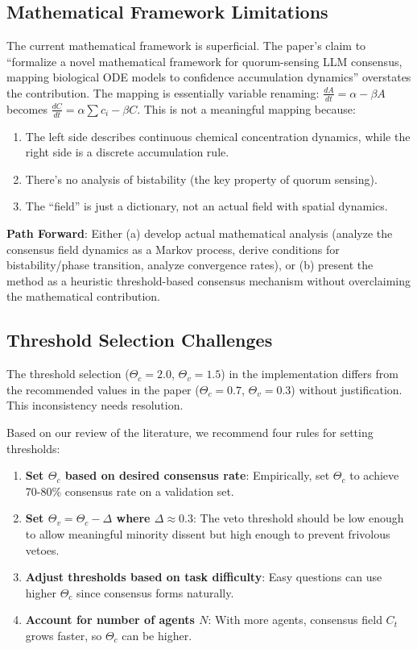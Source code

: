 \documentclass[11pt,letterpaper]{article}
\begin{document}
\subsection{Mathematical Framework Limitations}

The current mathematical framework is superficial. The paper's claim to ``formalize a novel mathematical framework for quorum-sensing LLM consensus, mapping biological ODE models to confidence accumulation dynamics'' overstates the contribution. The mapping is essentially variable renaming: $\frac{dA}{dt} = \alpha - \beta A$ becomes $\frac{dC}{dt} = \alpha \sum c_i - \beta C$. This is not a meaningful mapping because:

\begin{enumerate}
\item The left side describes continuous chemical concentration dynamics, while the right side is a discrete accumulation rule.
\item There's no analysis of bistability (the key property of quorum sensing).
\item The ``field'' is just a dictionary, not an actual field with spatial dynamics.
\end{enumerate}

\textbf{Path Forward}: Either (a) develop actual mathematical analysis (analyze the consensus field dynamics as a Markov process, derive conditions for bistability/phase transition, analyze convergence rates), or (b) present the method as a heuristic threshold-based consensus mechanism without overclaiming the mathematical contribution.

\subsection{Threshold Selection Challenges}

The threshold selection ($\Theta_c=2.0$, $\Theta_v=1.5$) in the implementation differs from the recommended values in the paper ($\Theta_c=0.7$, $\Theta_v=0.3$) without justification. This inconsistency needs resolution.

Based on our review of the literature, we recommend four rules for setting thresholds:

\begin{enumerate}
\item \textbf{Set $\Theta_c$ based on desired consensus rate}: Empirically, set $\Theta_c$ to achieve 70-80\% consensus rate on a validation set.
\item \textbf{Set $\Theta_v = \Theta_c - \Delta$ where $\Delta \approx 0.3$}: The veto threshold should be low enough to allow meaningful minority dissent but high enough to prevent frivolous vetoes.
\item \textbf{Adjust thresholds based on task difficulty}: Easy questions can use higher $\Theta_c$ since consensus forms naturally.
\item \textbf{Account for number of agents $N$}: With more agents, consensus field $C_t$ grows faster, so $\Theta_c$ can be higher.
\end{enumerate}
\end{document}
